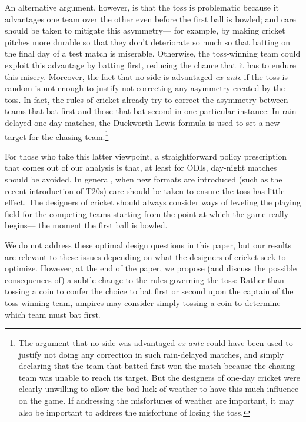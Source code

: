 \documentclass[11pt,  letterpaper]{article}
\begin{document}
An alternative argument, however, is that the toss is problematic because it advantages one team over the other even before the first ball is bowled; and care should be taken to mitigate this asymmetry--- for example, by making cricket pitches more durable so that they don't deteriorate so much so that batting on the final day of a test match is miserable. Otherwise, the toss-winning team could exploit this advantage by batting first, reducing the chance that it has to endure this misery. Moreover, the fact that no side is advantaged \emph{ex-ante} if the toss is random is not enough to justify not correcting any asymmetry created by the toss. In fact, the rules of cricket already try to correct the asymmetry between teams that bat first and those that bat second in one particular instance: In rain-delayed one-day matches, the Duckworth-Lewis formula is used to set a new target for the chasing team.\footnote{The argument that no side was advantaged \emph{ex-ante} could have been used to justify not doing any correction in such rain-delayed matches, and simply declaring that the team that batted first won the match because the chasing team was unable to reach its target. But the designers of one-day cricket were clearly unwilling to allow the bad luck of weather to have this much influence on the game. If addressing the misfortunes of weather are important, it may also be important to address the misfortune of losing the toss.} 

For those who take this latter viewpoint, a straightforward policy prescription that comes out of our analysis is that, at least for ODIs, day-night matches should be avoided. In general, when new formats are introduced (such as the recent introduction of T20s) care should be taken to ensure the toss has little effect. The designers of cricket should always consider ways of leveling the playing field for the competing teams starting from the point at which the game really begins--- the moment the first ball is bowled. 

We do not address these optimal design questions in this paper, but our results are relevant to these issues depending on what the designers of cricket seek to optimize. However, at the end of the paper, we propose (and discuss the possible consequences of) a subtle change to the rules governing the toss: Rather than tossing a coin to confer the choice to bat first or second upon the captain of the toss-winning team, umpires may consider simply tossing a coin to determine which team must bat first.
\end{document}
